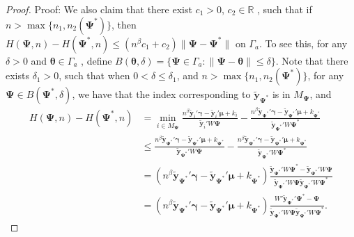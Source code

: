 \documentclass[final,11pt,3p]{article}\usepackage{setspace}
\begin{document}
\begin{proof}{Proof:}
We also claim that there exist $c_1 > 0$, $c_2 \in \mathbb{R}$ , such that if $n > \max \{n_1, n_2(\boldsymbol{\Psi}^*) \}$, then $H(\boldsymbol{\Psi},n) - H(\boldsymbol{\Psi}^*,n ) \le (n^{\beta}c_1+c_2) \|\boldsymbol{\Psi} - \boldsymbol{\Psi}^*\|$ on $\Gamma_a$. To see this, for any $\delta > 0$ and $\boldsymbol{\theta} \in \Gamma_a$ , define $B(\boldsymbol{\theta}, \delta) = \{\boldsymbol{\Psi} \in \Gamma_a: \| \boldsymbol{\Psi}-\boldsymbol{\theta} \| \le \delta\}$. Note that there exists $\delta_1 > 0$, such that when $0 < \delta \le \delta_1$, and $n > \max \{n_1, n_2(\boldsymbol{\Psi}^*)\}$, for any $\boldsymbol{\Psi} \in B(\boldsymbol{\Psi}^*, \delta)$, we have that the index corresponding to $\tilde{\boldsymbol{y}}_{\boldsymbol{\Psi}^*}$ is in $M_{\boldsymbol{\Psi}}$, and
\begin{align*}
H(\boldsymbol{\Psi},n)- H(\boldsymbol{\Psi}^*,n)& = \min_{i \in M_{\boldsymbol{\Psi}}} \frac{n^{\beta} \tilde{\boldsymbol{y}}_i'\boldsymbol{\gamma}-  \tilde{\boldsymbol{y}}_i'\boldsymbol{\mu}  + k_i}{ \tilde{\boldsymbol{y}}_i' W \boldsymbol{\Psi} } - \frac{n^{\beta} \tilde{\boldsymbol{y}}_{\boldsymbol{\Psi}^*}'\boldsymbol{\gamma} -  \tilde{\boldsymbol{y}}_{\boldsymbol{\Psi}^*}'\boldsymbol{\mu}  + k_{\boldsymbol{\Psi}^*}}{ \tilde{\boldsymbol{y}}_{\boldsymbol{\Psi}^*}' W \boldsymbol{\Psi}^*} \\
& \le \frac{n^{\beta} \tilde{\boldsymbol{y}}_{\boldsymbol{\Psi}^*}'\boldsymbol{\gamma} -  \tilde{\boldsymbol{y}}_{\boldsymbol{\Psi}^*}'\boldsymbol{\mu}  + k_{\boldsymbol{\Psi}^*}}{ \tilde{\boldsymbol{y}}_{\boldsymbol{\Psi}^*}' W \boldsymbol{\Psi}} - \frac{n^{\beta} \tilde{\boldsymbol{y}}_{\boldsymbol{\Psi}^*}'\boldsymbol{\gamma} - \tilde{\boldsymbol{y}}_{\boldsymbol{\Psi}^*}'\boldsymbol{\mu}  + k_{\boldsymbol{\Psi}^*}}{ \tilde{\boldsymbol{y}}_{\boldsymbol{\Psi}^*}' W \boldsymbol{\Psi}^*} \\
& = (n^{\beta}\tilde{\boldsymbol{y}}_{\boldsymbol{\Psi}^*}'\boldsymbol{\gamma} -  \tilde{\boldsymbol{y}}_{\boldsymbol{\Psi}^*}'\boldsymbol{\mu}  + k_{\boldsymbol{\Psi}^*})\frac{ \tilde{\boldsymbol{y}}_{\boldsymbol{\Psi}^*}' W \boldsymbol{\Psi}^* -  \tilde{\boldsymbol{y}}_{\boldsymbol{\Psi}^*}' W\boldsymbol{\Psi}}{ \tilde{\boldsymbol{y}}_{\boldsymbol{\Psi}^*}' W \boldsymbol{\Psi}   \tilde{\boldsymbol{y}}_{\boldsymbol{\Psi}^*}' W\boldsymbol{\Psi}^*}\\
& = (n^{\beta} \tilde{\boldsymbol{y}}_{\boldsymbol{\Psi}^*}'\boldsymbol{\gamma} -  \tilde{\boldsymbol{y}}_{\boldsymbol{\Psi}^*}'\boldsymbol{\mu}  + k_{\boldsymbol{\Psi}^*})\frac{ W'\tilde{\boldsymbol{y}}_{\boldsymbol{\Psi}^*}' \boldsymbol{\Psi}^*- \boldsymbol{\Psi} }{ \tilde{\boldsymbol{y}}_{\boldsymbol{\Psi}^*}' W \boldsymbol{\Psi}  \tilde{\boldsymbol{y}}_{\boldsymbol{\Psi}^*}' W\boldsymbol{\Psi}^*}.

\end{align*}
\end{proof}
\end{document}
